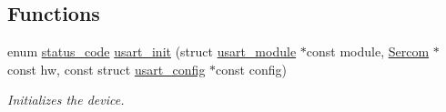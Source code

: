 \subsection*{Functions}
\begin{DoxyCompactItemize}
\item 
enum \mbox{\hyperlink{group__group__sam0__utils__status__codes_ga751c892e5a46b8e7d282085a5a5bf151}{status\+\_\+code}} \mbox{\hyperlink{group__asfdoc__sam0__sercom__usart__group_gad67046f395137b2a7a1ef72f83907674}{usart\+\_\+init}} (struct \mbox{\hyperlink{structusart__module}{usart\+\_\+module}} $\ast$const module, \mbox{\hyperlink{union_sercom}{Sercom}} $\ast$const hw, const struct \mbox{\hyperlink{structusart__config}{usart\+\_\+config}} $\ast$const config)
\begin{DoxyCompactList}\small\item\em Initializes the device. \end{DoxyCompactList}\end{DoxyCompactItemize}
